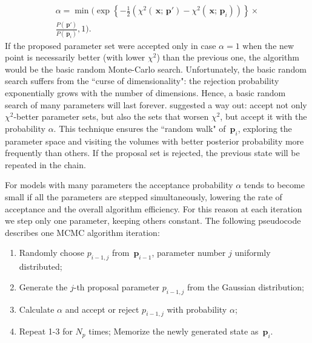 \documentclass[preprint2]{aastex}
\newcommand{\bfp}{\,\mathbf{p}}
\newcommand{\bfx}{\,\mathbf{x}}
\begin{document}
\begin{eqnarray}
  \label{accept_probab3}
  \alpha =  \min \biggl( \exp \left\lbrace -\frac{1}{2}\left( \chi^2(\bfx;\bfp') - 
                        \chi^2(\bfx;\bfp_i) \right)  \right\rbrace     \times              \nonumber \\
            \frac{P(\bfp')} {P(\bfp_i)}, 1 \biggr) .    
\end{eqnarray}
If the proposed parameter set were accepted only in case $\alpha=1$ when the new point is necessarily better (with lower $\chi^2$) than the previous one, the algorithm would be the basic random Monte-Carlo search. Unfortunately, the basic random search suffers from the ``curse of dimensionality": the rejection probability exponentially grows with the number of dimensions. Hence, a basic random search of many parameters will last forever. \citet{Metropolis_etal_1953} suggested a way out: accept not only $\chi^2$-better parameter sets, but also the sets that worsen $\chi^2$, but accept it with the probability $\alpha$. This technique ensures the ``random walk" of $\bfp_i$, exploring the parameter space and visiting the volumes with better posterior probability more frequently than others. If the proposal set is rejected, the previous state will be repeated in the chain.

For models with many parameters the acceptance probability $\alpha$ tends to become small if all the parameters are stepped simultaneously, lowering the rate of acceptance and the overall algorithm efficiency. For this reason at each iteration we step only one parameter, keeping others constant. The following pseudocode describes one MCMC algorithm iteration:
\begin{enumerate}
\item Randomly choose $p_{i-1,j}$ from $\bfp_{i-1}$, parameter number $j$ uniformly distributed;
\item Generate the $j$-th proposal parameter $p_{i-1,j}$ from the Gaussian distribution;
\item Calculate $\alpha$ and accept or reject $p_{i-1,j}$ with probability $\alpha$;
\item Repeat 1-3 for $N_p$ times; Memorize the newly generated state as $\bfp_i$.
\end{enumerate}
\end{document}
